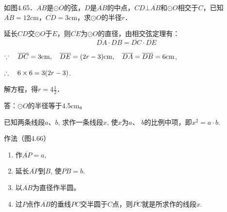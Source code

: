   
  \begin{example}
    如图4.65．$\overline{AB}$是$\odot O$的弦，$D$是$\overline{AB}$的中点，$CD\bot \overline{AB}$和$\odot O$相交于$C$，已知$\overline{AB}=12$cm，$\overline{CD}=3$cm，求$\odot O$的半径$r$．
  \end{example}
  
  \begin{solution}
  延长$CD$交$\odot O$于$E$，则$\overline{CE}$为$\odot O$的直径，由相交弦定理有：
  \[\overline{DA}\cdot \overline{DB}=\overline{DC}\cdot \overline{DE}\]
  
  $\because\quad \overline{DC}=3{\rm cm},\quad  \overline{DE}=(2r-3){\rm cm},\quad \overline{DA}=\overline{DB}=6{\rm cm}$,
  
  $\therefore\quad 6\times6=3(2r-3)$.
  
  解方程，得$r=4\frac{1}{2}$．
  
  答：$\odot O$的半径等于4.5cm。
  \end{solution}
  
  \begin{example}
    已知两条线段$a$、$b$, 求作一条线段$x$, 使$x$为$a$、
$b$的比例中项，即$x^2=a\cdot b$.
\end{example}

作法（图4.66）
\begin{enumerate}
    \item 作$\overline{AP}=a$,
    \item 延长$\overline{AP}$到$B$, 使$\overline{PB}=b$.
    \item 以$\overline{AB}$为直径作半圆。
    \item 过$P$点作$\overline{AB}$的垂线$PC$交半圆于$C$点，则$\overline{PC}$就是所求作的线段$x$.
\end{enumerate}

\begin{figure}[htp]
    \centering
{}
    \caption{}
\end{figure}


